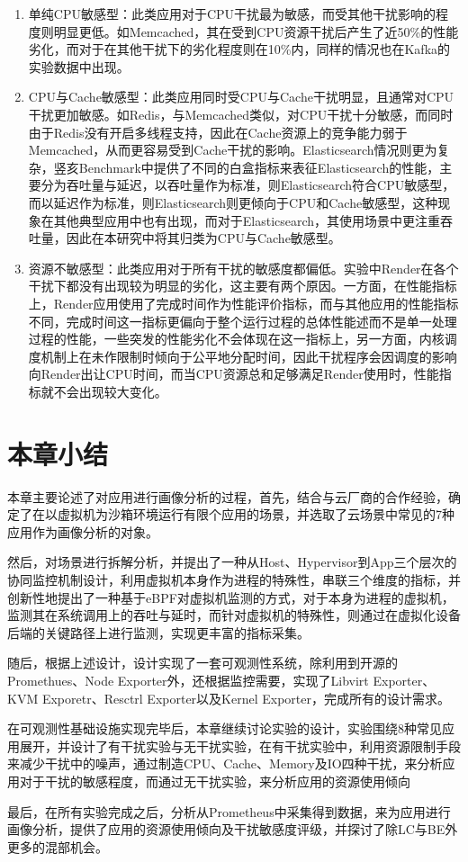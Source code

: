 \begin{enumerate}
    \item 单纯CPU敏感型：此类应用对于CPU干扰最为敏感，而受其他干扰影响的程度则明显更低。如Memcached，其在受到CPU资源干扰后产生了近50\%的性能劣化，而对于在其他干扰下的劣化程度则在10\%内，同样的情况也在Kafka的实验数据中出现。
    \item CPU与Cache敏感型：此类应用同时受CPU与Cache干扰明显，且通常对CPU干扰更加敏感。如Redis，与Memcached类似，对CPU干扰十分敏感，而同时由于Redis没有开启多线程支持，因此在Cache资源上的竞争能力弱于Memcached，从而更容易受到Cache干扰的影响。Elasticsearch情况则更为复杂，竖亥Benchmark中提供了不同的白盒指标来表征Elasticsearch的性能，主要分为吞吐量与延迟，以吞吐量作为标准，则Elasticsearch符合CPU敏感型，而以延迟作为标准，则Elasticsearch则更倾向于CPU和Cache敏感型，这种现象在其他典型应用中也有出现，而对于Elasticsearch，其使用场景中更注重吞吐量，因此在本研究中将其归类为CPU与Cache敏感型。
    \item 资源不敏感型：此类应用对于所有干扰的敏感度都偏低。实验中Render在各个干扰下都没有出现较为明显的劣化，这主要有两个原因。一方面，在性能指标上，Render应用使用了完成时间作为性能评价指标，而与其他应用的性能指标不同，完成时间这一指标更偏向于整个运行过程的总体性能述而不是单一处理过程的性能，一些突发的性能劣化不会体现在这一指标上，另一方面，内核调度机制上在未作限制时倾向于公平地分配时间，因此干扰程序会因调度的影响向Render出让CPU时间，而当CPU资源总和足够满足Render使用时，性能指标就不会出现较大变化。
\end{enumerate}

\section{本章小结}

本章主要论述了对应用进行画像分析的过程，首先，结合与云厂商的合作经验，确定了在以虚拟机为沙箱环境运行有限个应用的场景，并选取了云场景中常见的7种应用作为画像分析的对象。

然后，对场景进行拆解分析，并提出了一种从Host、Hypervisor到App三个层次的协同监控机制设计，利用虚拟机本身作为进程的特殊性，串联三个维度的指标，并创新性地提出了一种基于eBPF对虚拟机监测的方式，对于本身为进程的虚拟机，监测其在系统调用上的吞吐与延时，而针对虚拟机的特殊性，则通过在虚拟化设备后端的关键路径上进行监测，实现更丰富的指标采集。

随后，根据上述设计，设计实现了一套可观测性系统，除利用到开源的Promethues、Node Exporter外，还根据监控需要，实现了Libvirt Exporter、KVM Exporetr、Resctrl Exporter以及Kernel Exporter，完成所有的设计需求。

在可观测性基础设施实现完毕后，本章继续讨论实验的设计，实验围绕8种常见应用展开，并设计了有干扰实验与无干扰实验，在有干扰实验中，利用资源限制手段来减少干扰中的噪声，通过制造CPU、Cache、Memory及IO四种干扰，来分析应用对于干扰的敏感程度，而通过无干扰实验，来分析应用的资源使用倾向

最后，在所有实验完成之后，分析从Prometheus中采集得到数据，来为应用进行画像分析，提供了应用的资源使用倾向及干扰敏感度评级，并探讨了除LC与BE外更多的混部机会。